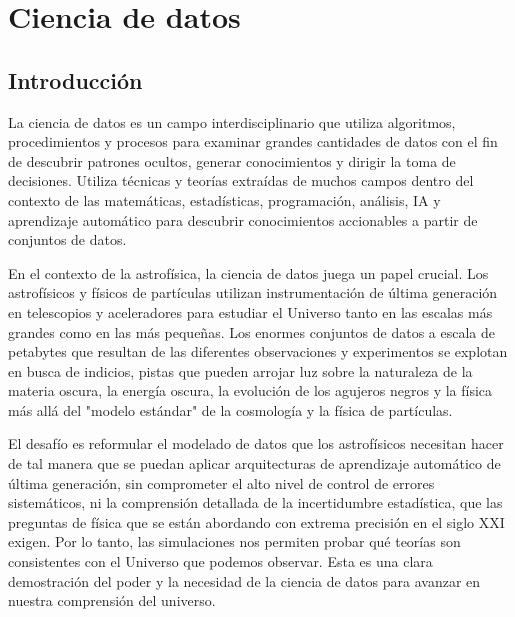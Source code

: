 
\chapter{Ciencia de datos}\label{ch:octavo-capitulo}
\section{Introducción}
La ciencia de datos es un campo interdisciplinario que utiliza algoritmos, procedimientos y procesos para examinar grandes cantidades de datos con el fin de descubrir patrones ocultos, generar conocimientos y dirigir la toma de decisiones. Utiliza técnicas y teorías extraídas de muchos campos dentro del contexto de las matemáticas, estadísticas, programación, análisis, IA y aprendizaje automático para descubrir conocimientos accionables a partir de conjuntos de datos.\par

En el contexto de la astrofísica, la ciencia de datos juega un papel crucial. Los astrofísicos y físicos de partículas utilizan instrumentación de última generación en telescopios y aceleradores para estudiar el Universo tanto en las escalas más grandes como en las más pequeñas. Los enormes conjuntos de datos a escala de petabytes que resultan de las diferentes observaciones y experimentos se explotan en busca de indicios, pistas que pueden arrojar luz sobre la naturaleza de la materia oscura, la energía oscura, la evolución de los agujeros negros y la física más allá del "modelo estándar" de la cosmología y la física de partículas.\par

El desafío es reformular el modelado de datos que los astrofísicos necesitan hacer de tal manera que se puedan aplicar arquitecturas de aprendizaje automático de última generación, sin comprometer el alto nivel de control de errores sistemáticos, ni la comprensión detallada de la incertidumbre estadística, que las preguntas de física que se están abordando con extrema precisión en el siglo XXI exigen. Por lo tanto, las simulaciones nos permiten probar qué teorías son consistentes con el Universo que podemos observar. Esta es una clara demostración del poder y la necesidad de la ciencia de datos para avanzar en nuestra comprensión del universo.\par


